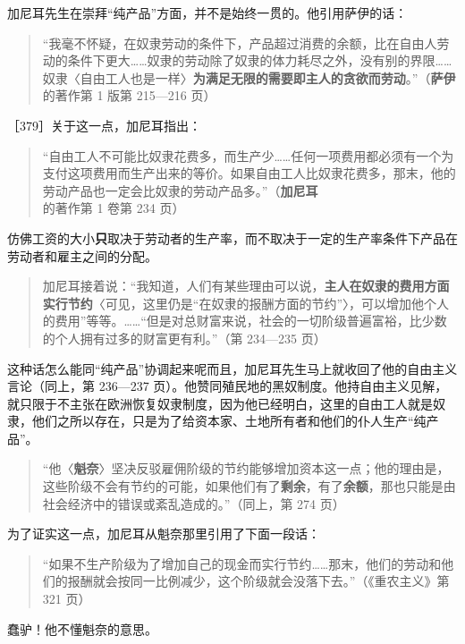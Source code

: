 加尼耳先生在崇拜“纯产品”方面，并不是始终一贯的。他引用萨伊的话：

\begin{quote}“我毫不怀疑，在奴隶劳动的条件下，产品超过消费的余额，比在自由人劳动的条件下更大……奴隶的劳动除了奴隶的体力耗尽之外，没有别的界限……奴隶〈自由工人也是一样〉\textbf{为满足无限的需要即主人的贪欲而劳动}。”（\textbf{萨伊}的著作第 1 版第 215—216 页）\end{quote}

［379］关于这一点，加尼耳指出：

\begin{quote}“自由工人不可能比奴隶花费多，而生产少……任何一项费用都必须有一个为支付这项费用而生产出来的等价。如果自由工人比奴隶花费多，那末，他的劳动产品也一定会比奴隶的劳动产品多。”（\textbf{加尼耳}的著作第 1 卷第 234 页）\end{quote}

仿佛工资的大小\textbf{只}取决于劳动者的生产率，而不取决于一定的生产率条件下产品在劳动者和雇主之间的分配。

\begin{quote}加尼耳接着说：“我知道，人们有某些理由可以说，\textbf{主人在奴隶的费用方面实行节约}〈可见，这里仍是“在奴隶的报酬方面的节约”〉，可以增加他个人的费用”等等。……“但是对总财富来说，社会的一切阶级普遍富裕，比少数的个人拥有过多的财富更有利。”（第 234—235 页）\end{quote}

这种话怎么能同“纯产品”协调起来呢而且，加尼耳先生马上就收回了他的自由主义言论（同上，第 236—237 页）。他赞同殖民地的黑奴制度。他持自由主义见解，就只限于不主张在欧洲恢复奴隶制度，因为他已经明白，这里的自由工人就是奴隶，他们之所以存在，只是为了给资本家、土地所有者和他们的仆人生产“纯产品”。

\begin{quote}“他〈\textbf{魁奈}〉坚决反驳雇佣阶级的节约能够增加资本这一点；他的理由是，这些阶级不会有节约的可能，如果他们有了\textbf{剩余}，有了\textbf{余额}，那也只能是由社会经济中的错误或紊乱造成的。”（同上，第 274 页）\end{quote}

为了证实这一点，加尼耳从魁奈那里引用了下面一段话：

\begin{quote}“如果不生产阶级为了增加自己的现金而实行节约……那末，他们的劳动和他们的报酬就会按同一比例减少，这个阶级就会没落下去。”（《重农主义》第 321 页）\end{quote}

蠢驴！他不懂魁奈的意思。

